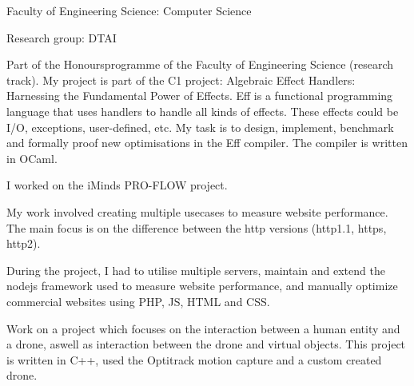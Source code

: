 \begin{cventries}
{\begin{cvitems}\item Faculty of Engineering Science: Computer Science
\item Research group: DTAI
\item Part of the Honoursprogramme of the Faculty of Engineering Science (research track).  My project is part of the C1 project: Algebraic Effect Handlers: Harnessing the Fundamental Power of Effects. Eff is a functional programming language that uses handlers to handle all kinds of effects. These effects could be I/O, exceptions, user-defined, etc. My task is to design, implement, benchmark and formally proof new optimisations in the Eff compiler. The compiler is written in OCaml.
\end{cvitems}
}

{\begin{cvitems}\item I worked on the iMinds PRO-FLOW project.
\item My work involved creating multiple usecases to measure website performance. The main focus is on the difference between the http versions (http1.1, https, http2).
\item During the project, I had to utilise multiple servers, maintain and extend the nodejs framework used to measure website performance, and manually optimize commercial websites using PHP, JS, HTML and CSS.
\end{cvitems}
}

{\begin{cvitems}\item Work on a project which focuses on the interaction between a human entity and a drone, aswell as interaction between the drone and virtual objects. This project is written in C++, used the Optitrack motion capture and a custom created drone.
\end{cvitems}
}


\end{cventries}
